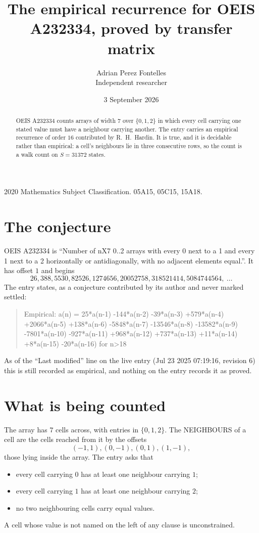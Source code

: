 \documentclass[11pt,a4paper]{article}
\title{The empirical recurrence for OEIS A232334, proved by transfer matrix}
\author{Adrian Perez Fontelles\\ \small Independent researcher}
\date{3 September 2026}
\theoremstyle{plain}
\theoremstyle{definition}
\begin{document}
\maketitle

\begin{abstract}
OEIS A232334 counts arrays of width $7$ over $\{0,1,2\}$ in which every cell carrying one stated
value must have a neighbour carrying another. The entry carries an empirical recurrence of
order $16$ contributed by R.~H.~Hardin. It is true, and it is decidable rather than
empirical: a cell's neighbours lie in three consecutive rows, so the count is a walk count on
$S=31372$ states.
\end{abstract}

\noindent\small 2020 Mathematics Subject Classification. 05A15, 05C15, 15A18.\normalsize

\section{The conjecture}

OEIS A232334 is ``Number of nX7 0..2 arrays with every 0 next to a 1 and every 1 next to a 2 horizontally or antidiagonally, with no adjacent elements equal.''. It has offset $1$ and begins
\[
26, 388, 5530, 82526, 1274656, 20052758, 318521414, 5084744564,\ \dots
\]
The entry states, as a conjecture contributed by its author and never marked settled:
\begin{quote}
Empirical: a(n) = 25*a(n-1) -144*a(n-2) -39*a(n-3) +579*a(n-4) +2066*a(n-5) +138*a(n-6) -5848*a(n-7) -13546*a(n-8) -13582*a(n-9) -7801*a(n-10) -927*a(n-11) +968*a(n-12) +737*a(n-13) +11*a(n-14) +8*a(n-15) -20*a(n-16) for n>18
\end{quote}
As of the ``Last modified'' line on the live entry (Jul 23 2025 07:19:16, revision 6) this is still
recorded as empirical, and nothing on the entry records it as proved.

\section{What is being counted}

The array has $7$ cells across, with entries in $\{0,1,2\}$. The NEIGHBOURS of a cell are the
cells reached from it by the offsets
\[
(-1,1), (0,-1), (0,1), (1,-1),
\]
those lying inside the array. The entry asks that
\begin{itemize}
\item every cell carrying $0$ has at least one neighbour carrying $1$;
\item every cell carrying $1$ has at least one neighbour carrying $2$;
\item no two neighbouring cells carry equal values.
\end{itemize}
A cell whose value is not named on the left of any clause is unconstrained.
\end{document}

